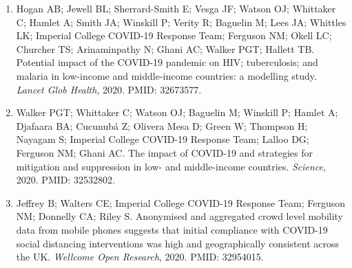 \documentclass[11pt,letterpaper]{article}
\begin{document}
\begin{enumerate}[leftmargin=*, itemsep=4pt, parsep=0pt]
\item Hogan AB; Jewell BL; Sherrard-Smith E; Vesga JF; Watson OJ; Whittaker C; Hamlet A; Smith JA; Winskill P; Verity R; Baguelin M; Lees JA; Whittles LK; Imperial College COVID-19 Response Team; Ferguson NM; Okell LC; Churcher TS; Arinaminpathy N; Ghani AC; Walker PGT; Hallett TB. Potential impact of the COVID-19 pandemic on HIV; tuberculosis; and malaria in low-income and middle-income countries: a modelling study. \textit{Lancet Glob Health}, 2020. PMID: 32673577.

\item Walker PGT; Whittaker C; Watson OJ; Baguelin M; Winskill P; Hamlet A; Djafaara BA; Cucunubá Z; Olivera Mesa D; Green W; Thompson H; Nayagam S; Imperial College COVID-19 Response Team; Lalloo DG; Ferguson NM; Ghani AC. The impact of COVID-19 and strategies for mitigation and suppression in low- and middle-income countries. \textit{Science}, 2020. PMID: 32532802.

\item Jeffrey B; Walters CE; Imperial College COVID-19 Response Team; Ferguson NM; Donnelly CA; Riley S. Anonymised and aggregated crowd level mobility data from mobile phones suggests that initial compliance with COVID-19 social distancing interventions was high and geographically consistent across the UK. \textit{Wellcome Open Research}, 2020. PMID: 32954015.

\end{enumerate}
\end{document}

